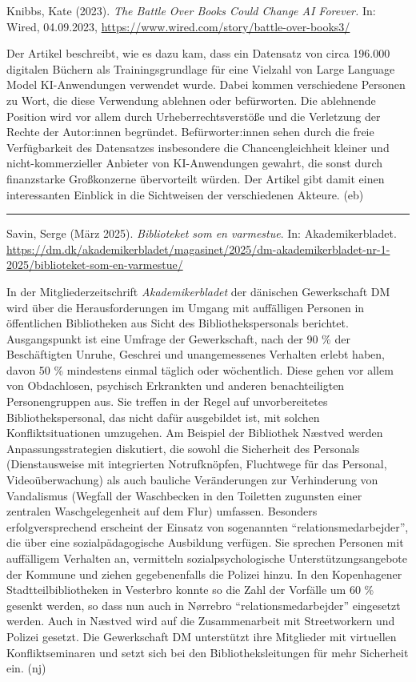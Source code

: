 \documentclass[a4paper,
fontsize=11pt,
oneside,
numbers=noperiodatend,
parskip=half-,
bibliography=totoc,
final
]{scrartcl}
\begin{document}
Knibbs, Kate (2023). \emph{The Battle Over Books Could Change AI
Forever.} In: Wired, 04.09.2023,
\url{https://www.wired.com/story/battle-over-books3/}

Der Artikel beschreibt, wie es dazu kam, dass ein Datensatz von circa
196.000 digitalen Büchern als Trainingsgrundlage für eine Vielzahl von
Large Language Model KI-Anwendungen verwendet wurde. Dabei kommen
verschiedene Personen zu Wort, die diese Verwendung ablehnen oder
befürworten. Die ablehnende Position wird vor allem durch
Urheberrechtsverstöße und die Verletzung der Rechte der Autor:innen
begründet. Befürworter:innen sehen durch die freie Verfügbarkeit des
Datensatzes insbesondere die Chancengleichheit kleiner und
nicht-kommerzieller Anbieter von KI-Anwendungen gewahrt, die sonst durch
finanzstarke Großkonzerne übervorteilt würden. Der Artikel gibt damit
einen interessanten Einblick in die Sichtweisen der verschiedenen
Akteure. (eb)

\begin{center}\rule{0.5\linewidth}{0.5pt}\end{center}

Savin, Serge (März 2025). \emph{Biblioteket som en varmestue}. In:
Akademikerbladet.
\url{https://dm.dk/akademikerbladet/magasinet/2025/dm-akademikerbladet-nr-1-2025/biblioteket-som-en-varmestue/}

In der Mitgliederzeitschrift \emph{Akademikerbladet} der dänischen
Gewerkschaft DM wird über die Herausforderungen im Umgang mit
auffälligen Personen in öffentlichen Bibliotheken aus Sicht des
Bibliothekspersonals berichtet. Ausgangspunkt ist eine Umfrage der
Gewerkschaft, nach der 90 \% der Beschäftigten Unruhe, Geschrei und
unangemessenes Verhalten erlebt haben, davon 50 \% mindestens einmal
täglich oder wöchentlich. Diese gehen vor allem von Obdachlosen,
psychisch Erkrankten und anderen benachteiligten Personengruppen aus.
Sie treffen in der Regel auf unvorbereitetes Bibliothekspersonal, das
nicht dafür ausgebildet ist, mit solchen Konfliktsituationen umzugehen.
Am Beispiel der Bibliothek Næstved werden Anpassungsstrategien
diskutiert, die sowohl die Sicherheit des Personals (Dienstausweise mit
integrierten Notrufknöpfen, Fluchtwege für das Personal,
Videoüberwachung) als auch bauliche Veränderungen zur Verhinderung von
Vandalismus (Wegfall der Waschbecken in den Toiletten zugunsten einer
zentralen Waschgelegenheit auf dem Flur) umfassen. Besonders
erfolgversprechend erscheint der Einsatz von sogenannten
\enquote{relationsmedarbejder}, die über eine sozialpädagogische
Ausbildung verfügen. Sie sprechen Personen mit auffälligem Verhalten an,
vermitteln sozialpsychologische Unterstützungsangebote der Kommune und
ziehen gegebenenfalls die Polizei hinzu. In den Kopenhagener
Stadtteilbibliotheken in Vesterbro konnte so die Zahl der Vorfälle um 60
\% gesenkt werden, so dass nun auch in Nørrebro
\enquote{relationsmedarbejder} eingesetzt werden. Auch in Næstved wird
auf die Zusammenarbeit mit Streetworkern und Polizei gesetzt. Die
Gewerkschaft DM unterstützt ihre Mitglieder mit virtuellen
Konfliktseminaren und setzt sich bei den Bibliotheksleitungen für mehr
Sicherheit ein. (nj)
\end{document}
